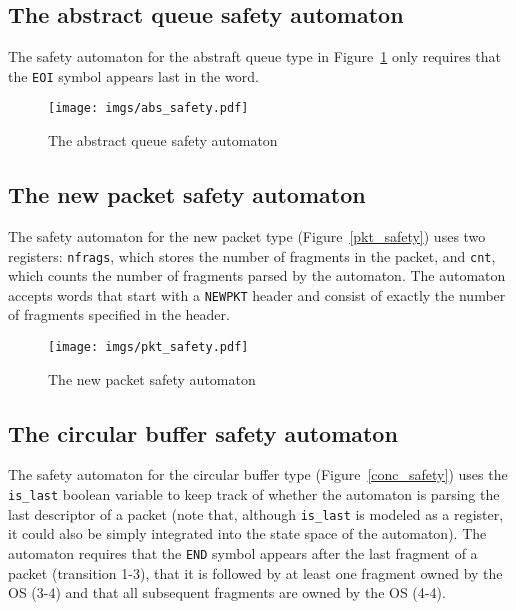 \documentclass{article}
\begin{document}
\subsection{The abstract queue safety automaton}

The safety automaton for the abstraft queue type in 
Figure~\ref{f:abs_safety} only requires that the \texttt{EOI} 
symbol appears last in the word.

\begin{figure}[t]
    \center
    \texttt{[image: imgs/abs\_safety.pdf]}
    \caption{The abstract queue safety automaton}\label{f:abs_safety}
\end{figure}


\subsection{The new packet safety automaton}

The safety automaton for the new packet type 
(Figure~\ref{pkt_safety}) uses two registers: \texttt{nfrags}, 
which stores the number of fragments in the packet, and 
\texttt{cnt}, which counts the number of fragments parsed by the 
automaton.  The automaton accepts words that start with a 
\texttt{NEWPKT} header and consist of exactly the number of 
fragments specified in the header. 

\begin{figure}[t]
    \center
    \texttt{[image: imgs/pkt\_safety.pdf]}
    \caption{The new packet safety automaton}\label{f:pkt_safety}
\end{figure}




\subsection{The circular buffer safety 
automaton}\label{s:conc_safety}

The safety automaton for the circular buffer type 
(Figure~\ref{conc_safety}) uses the \texttt{is\_last} boolean 
variable to keep track of whether the automaton is parsing the 
last descriptor of a packet (note that, although \texttt{is\_last} 
is modeled as a register, it could also be simply integrated into 
the state space of the automaton).  The automaton requires that 
the \texttt{END} symbol appears after the last fragment of a 
packet (transition 1-3), that it is followed by at least one 
fragment owned by the OS (3-4) and that all subsequent fragments 
are owned by the OS (4-4).  
\end{document}
